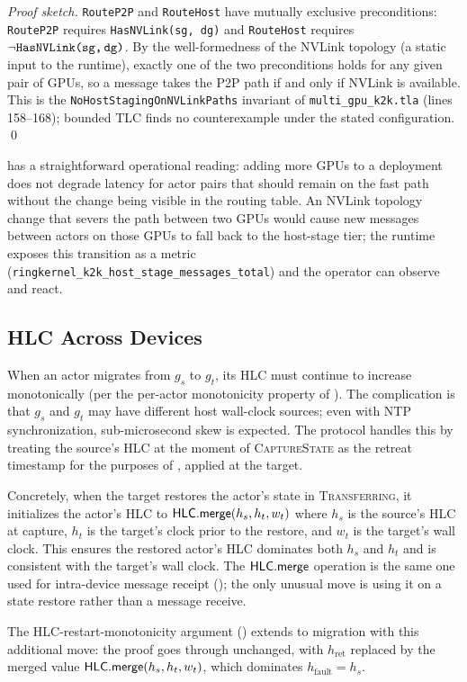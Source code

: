 \begin{proof}[Proof sketch]
\texttt{RouteP2P} and \texttt{RouteHost} have mutually exclusive
preconditions: \texttt{RouteP2P} requires
\texttt{HasNVLink(sg,\,dg)} and \texttt{RouteHost} requires
\(\neg\texttt{HasNVLink(sg,\,dg)}\).  By the well-formedness of the
NVLink topology (a static input to the runtime), exactly one of the
two preconditions holds for any given pair of GPUs, so a message
takes the P2P path if and only if NVLink is available.  This is the
\texttt{NoHostStagingOnNVLinkPaths} invariant of
\texttt{multi\_\allowbreak gpu\_\allowbreak k2k.tla} (lines
158--168); bounded TLC finds no counterexample under the stated
configuration.
\qed
\end{proof}

 has a straightforward operational
reading: adding more GPUs to a deployment does not degrade latency
for actor pairs that should remain on the fast path without the
change being visible in the routing table.  An NVLink topology change that severs the path between two
GPUs would cause new messages between actors on those GPUs to fall
back to the host-stage tier; the runtime exposes this transition
as a metric (\texttt{ringkernel\_k2k\_host\_stage\_messages\_total})
and the operator can observe and react.

\subsection{HLC Across Devices}
\label{sec:migration:hlc-cross}

When an actor migrates from \(g_s\) to \(g_t\), its HLC must
continue to increase monotonically (per the per-actor monotonicity
property of ).  The complication
is that \(g_s\) and \(g_t\) may have different host wall-clock
sources; even with NTP synchronization, sub-microsecond skew is
expected.  The protocol handles this by treating the source's HLC
at the moment of \textsc{CaptureState} as the retreat timestamp
for the purposes of , applied at
the target.

Concretely, when the target restores the actor's state in
\textsc{Transferring}, it initializes the actor's HLC to
\(\mathsf{HLC}.\mathsf{merge}(h_s, h_t, w_t)\) where \(h_s\) is the
source's HLC at capture, \(h_t\) is the target's clock prior to the
restore, and \(w_t\) is the target's wall clock.  This ensures the
restored actor's HLC dominates both \(h_s\) and \(h_t\) and is
consistent with the target's wall clock.  The
\(\mathsf{HLC}.\mathsf{merge}\) operation is the same one used for
intra-device message receipt (); the only
unusual move is using it on a state restore rather than a message
receive.

The HLC-restart-monotonicity argument
() extends to migration with this
additional move: the proof goes through unchanged, with
\(h_{\mathrm{ret}}\) replaced by the merged value
\(\mathsf{HLC}.\mathsf{merge}(h_s, h_t, w_t)\), which dominates
\(h_{\mathrm{fault}} = h_s\).
